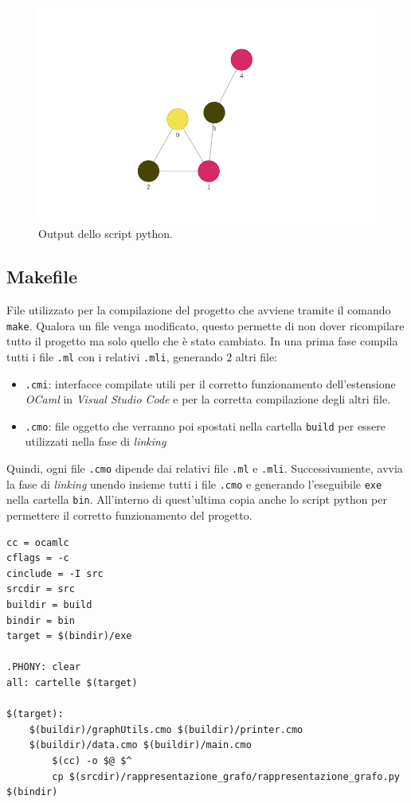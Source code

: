 \begin{figure}[H]
	\centering
	\includegraphics[width=.6\textwidth]{img/grafocoloratopy.png}
	\caption{Output dello script python.}
\end{figure}

\subsection{Makefile}

File utilizzato per la compilazione del progetto che avviene tramite il comando \lstinline[style=cmd]|make|. 
Qualora un file venga modificato, questo permette di non dover ricompilare tutto il progetto ma solo quello che è stato cambiato. In una prima fase compila tutti i file \lstinline[style=cmd]|.ml| con i relativi \lstinline[style=cmd]|.mli|, generando 2 altri file:

\begin{itemize}
	\item \lstinline[style=cmd]|.cmi|: interfacce compilate utili per il corretto funzionamento dell'estensione \textit{OCaml} in \textit{Visual Studio Code} e per la corretta compilazione degli altri file.
	\item \lstinline[style=cmd]|.cmo|: file oggetto che verranno poi spostati nella cartella \lstinline[style=cmd]|build| per essere utilizzati nella fase di \textit{linking}
\end{itemize}

Quindi, ogni file \lstinline[style=cmd]|.cmo| dipende dai relativi file \lstinline[style=cmd]|.ml| e \lstinline[style=cmd]|.mli|.
Successivamente, avvia la fase di \textit{linking} unendo insieme tutti i file \lstinline[style=cmd]|.cmo| e generando l'eseguibile \lstinline[style=cmd]|exe| nella cartella \lstinline[style=cmd]|bin|. All'interno di quest'ultima copia anche lo script python per permettere il corretto funzionamento del progetto.\\

\begin{lstlisting}[style=make, caption={Breve estratto del file Makefile}]
cc = ocamlc
cflags = -c
cinclude = -I src
srcdir = src
buildir = build
bindir = bin
target = $(bindir)/exe

.PHONY: clear
all: cartelle $(target)

$(target): 
	$(buildir)/graphUtils.cmo $(buildir)/printer.cmo 
	$(buildir)/data.cmo $(buildir)/main.cmo
		$(cc) -o $@ $^
		cp $(srcdir)/rappresentazione_grafo/rappresentazione_grafo.py $(bindir)

\end{lstlisting}


